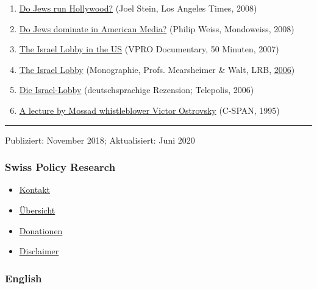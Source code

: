 \begin{enumerate}
\item
  \href{http://articles.latimes.com/2008/dec/19/opinion/oe-stein19}{Do
  Jews run Hollywood?} (Joel Stein, Los Angeles Times, 2008)
\item
  \href{https://mondoweiss.net/2008/02/do-jews-dominat/}{Do Jews
  dominate in American Media?} (Philip Weiss, Mondoweiss, 2008)
\item
  \href{https://www.youtube.com/watch?v=N294FMDok98}{The Israel Lobby in
  the US} (VPRO Documentary, 50 Minuten, 2007)
\item
  \href{https://www.lrb.co.uk/v28/n06/john-mearsheimer/the-israel-lobby}{The
  Israel Lobby} (Monographie, Profs. Mearsheimer \& Walt, LRB,
  \href{https://en.wikipedia.org/wiki/The_Israel_Lobby_and_U.S._Foreign_Policy}{2006})
\item
  \href{https://www.heise.de/tp/features/Israel-Lobby-in-den-USA-3407542.html}{Die
  Israel-Lobby} (deutschsprachige Rezension; Telepolis, 2006)
\item
  \href{https://archive.org/details/victor-ostrovsky-1995}{A lecture by
  Mossad whistleblower Victor Ostrovsky} (C-SPAN, 1995)
\end{enumerate}

\begin{center}\rule{0.5\linewidth}{\linethickness}\end{center}

Publiziert: November 2018; Aktualisiert: Juni 2020

\hypertarget{swiss-policy-research}{%
\subsubsection{Swiss Policy Research}\label{swiss-policy-research}}

\begin{itemize}
\tightlist
\item
  \href{https://swprs.org/kontakt/}{Kontakt}
\item
  \href{https://swprs.org/uebersicht/}{Übersicht}
\item
  \href{https://swprs.org/donationen/}{Donationen}
\item
  \href{https://swprs.org/disclaimer/}{Disclaimer}
\end{itemize}

\hypertarget{english}{%
\subsubsection{English}\label{english}}

